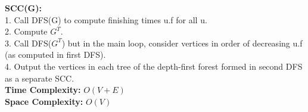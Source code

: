 {\begin{minipage}[t]{1.1\linewidth}
\begin{minipage}[t]{0.46\linewidth}
{\begin{minipage}[t]{0.98\linewidth}
                \textbf{SCC(G):}\\
                1. Call DFS(G) to compute finishing times u.f for all u.\\
                2. Compute $G^T$.\\
                3. Call DFS($G^T$) but in the main loop, consider vertices in order of decreasing u.f (as computed in first DFS).\\
                4. Output the vertices in each tree of the depth-first forest formed in second DFS as a separate SCC.\\
                \textbf{Time Complexity:} $O(V+E)$\\
                \textbf{Space Complexity:} $O(V)$
             \end{minipage}}
        \end{minipage}\\
    \end{minipage}
    }